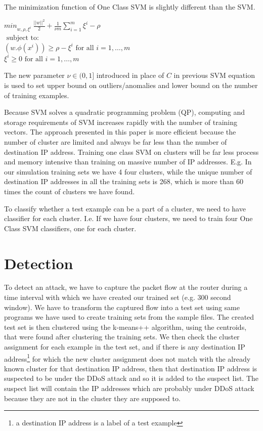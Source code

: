 \documentclass[12pt,oneside,a4paper]{article}
\begin{document}
The minimization function of One Class SVM is slightly different than the SVM. \cite{svm}

\begin{center}
  ${min}_{w,\rho,\xi^i} \ \frac{||w||^2}{2} + \frac{1}{\nu m} \sum_{i=1}^m \xi^i - \rho$ \\
  $\mbox{ subject to: }$ \\
  $(w.\phi(x^i)) \geq \rho - \xi^i \mbox{ for all } i = 1, \dots, m$ \\
  \hspace{2cm} $\xi^i \geq 0 \mbox{ for all } i = 1, \dots, m$ \\
\end{center}

The new parameter $\nu \in (0,1]$ introduced in place of $C$ in previous SVM equation is used to set upper bound on outliers/anomalies and lower bound on the number of training examples.

Because SVM solves a quadratic programming problem (QP), computing and storage requirements of SVM increases rapidly with the number of training vectors. The approach presented in this paper is more efficient because the number of cluster are limited and always be far less than the number of destination IP address. Training one class SVM on clusters will be far less process and memory intensive than training on massive number of IP addresses. E.g. In our simulation training sets we have 4 four clusters, while the unique number of destination IP addresses in all the training sets is 268, which is more than 60 times the count of clusters we have found.

To classify whether a test example can be a part of a cluster, we need to have classifier for each cluster. I.e. If we have four clusters, we need to train four One Class SVM classifiers, one for each cluster.

\section{Detection} \label{sec:Detection}

To detect an attack, we have to capture the packet flow at the router during a time interval with which we have created our trained set (e.g. 300 second window). We have to transform the captured flow into a test set using same programs we have used to create training sets from the sample files. The created test set is then clustered using the k-means++ algorithm, using the centroids, that were found after clustering the training sets. We then check the cluster assignment for each example in the test set, and if there is any destination IP address\footnote{a destination IP address is a label of a test example} for which the new cluster assignment does not match with the already known cluster for that destination IP address, then that destination IP address is suspected to be under the DDoS attack and so it is added to the suspect list. The suspect list will contain the IP addresses which are probably under DDoS attack because they are not in the cluster they are supposed to.
\end{document}
